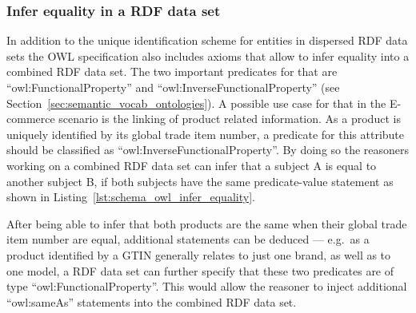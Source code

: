 \subsubsection{Infer equality in a \gls{RDF} data set}
\label{subsub:info_unique_infer}

In addition to the unique identification scheme for entities in dispersed \gls{RDF} data sets the \gls{OWL} specification also includes axioms that allow to infer equality into a combined \gls{RDF} data set. The two important predicates for that are ``owl:FunctionalProperty'' and ``owl:InverseFunctionalProperty'' (see Section~\ref{sec:semantic_vocab_ontologies}). A possible use case for that in the \gls{E-commerce} scenario is the linking of product related information. As a product is uniquely identified by its global trade item number, a predicate for this attribute should be classified as ``owl:InverseFunctionalProperty''. By doing so the reasoners working on a combined \gls{RDF} data set can infer that a subject A is equal to another subject B, if both subjects have the same predicate-value statement as shown in Listing~\ref{lst:schema_owl_infer_equality}. \@


After being able to infer that both products are the same when their global trade item number are equal, additional statements can be deduced --- e.g.\ as a product identified by a \gls{GTIN} generally relates to just one brand, as well as to one model, a \gls{RDF} data set can further specify that these two predicates are of type ``owl:FunctionalProperty''. This would allow the reasoner to inject additional ``owl:sameAs'' statements into the combined \gls{RDF} data set.


